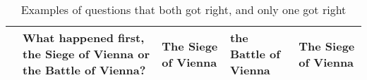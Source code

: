 \begin{table*}[t]
\begin{tabular}{p{7cm}p{2.8cm}p{1.5cm}p{1.5cm}p{1.5cm}}
 & What happened first, the Siege of Vienna or the Battle of Vienna?
 & The Siege of Vienna & the Battle of Vienna & The Siege of Vienna \\


 \bottomrule
\end{tabular}
\caption{Examples of questions that both got right, and only one got right}
\label{tab:error_examples}
\end{table*}


